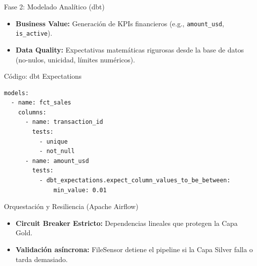 \documentclass{beamer}
\begin{document}
\begin{frame}{Fase 2: Modelado Analítico (dbt)}
    \begin{itemize}
        \item \textbf{Business Value:} Generación de KPIs financieros (e.g., \texttt{amount\_usd}, \texttt{is\_active}).
        \item \textbf{Data Quality:} Expectativas matemáticas rigurosas desde la base de datos (no-nulos, unicidad, límites numéricos).
    \end{itemize}
\end{frame}

\begin{frame}[fragile]{Código: dbt Expectations}
\begin{Verbatim}[fontsize=\footnotesize]
models:
  - name: fct_sales
    columns:
      - name: transaction_id
        tests:
          - unique
          - not_null
      - name: amount_usd
        tests:
          - dbt_expectations.expect_column_values_to_be_between:
              min_value: 0.01
\end{Verbatim}
\end{frame}

\begin{frame}{Orquestación y Resiliencia (Apache Airflow)}
    \begin{itemize}
        \item \textbf{Circuit Breaker Estricto:} Dependencias lineales que protegen la Capa Gold.
        \item \textbf{Validación asíncrona:} FileSensor detiene el pipeline si la Capa Silver falla o tarda demasiado.
    \end{itemize}
    \vspace{0.5cm}
    \begin{center}
    \end{center}
\end{frame}
\end{document}
